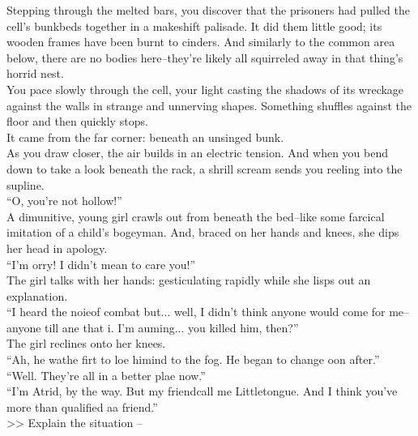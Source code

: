 Stepping through the melted bars, you discover that the prisoners had pulled the cell’s bunkbeds together in a makeshift palisade. It did them little good; its wooden frames have been burnt to cinders. And similarly to the common area below, there are no bodies here--they’re likely all squirreled away in that thing’s horrid nest.\\

You pace slowly through the cell, your light casting the shadows of its wreckage against the walls in strange and unnerving shapes. Something shuffles against the floor and then quickly stops.\\

It came from the far corner: beneath an unsinged bunk.\\

As you draw closer, the air builds in an electric tension. And when you bend down to take a look beneath the rack, a shrill scream sends you reeling into the supline.\\

“O, you’re not hollow!”\\

A dimunitive, young girl crawls out from beneath the bed--like some farcical imitation of a child’s bogeyman. And, braced on her hands and knees, she dips her head in apology.\\

“I’m \lisp orry! I didn’t mean to \lisp care you!”\\

The girl talks with her hands: gesticulating rapidly while she lisps out an explanation.\\

“I heard the noi\lisp e\lispx of combat but... well, I didn’t think anyone would come for me--anyone \lisp till \lisp ane that i\lisp . I’m a\lisp uming... you killed him, then?”\\

The girl reclines onto her knees.\\
“Ah, he wa\lispx the fir\lisp t to lo\lisp e hi\lispx mind to the fog. He began to change \lisp oon after.”\\

“Well. They’re all in a better pla\lisp e now.”\\

“I’m A\lisp trid, by the way. But my friend\lispx call me Littletongue. And I think you’ve more than qualified a\lispx a friend.”\\

>> Explain the situation -- 